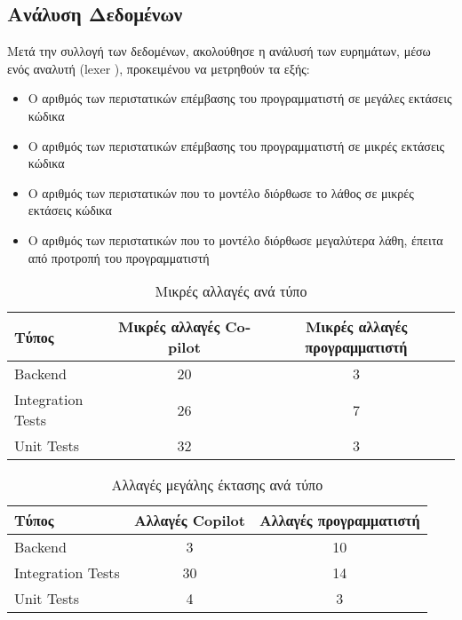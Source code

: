 \subsection{Ανάλυση Δεδομένων}

Μετά την συλλογή των δεδομένων, ακολούθησε η ανάλυσή των ευρημάτων, μέσω
ενός αναλυτή (\textlatin{lexer} \cite{ball2018}), προκειμένου να
μετρηθούν τα εξής:

\begin{itemize}
  \item
    O αριθμός των περιστατικών επέμβασης του προγραμματιστή σε μεγάλες
    εκτάσεις κώδικα
  \item
    Ο αριθμός των περιστατικών επέμβασης του προγραμματιστή σε μικρές
    εκτάσεις κώδικα
  \item
    Ο αριθμός των περιστατικών που το μοντέλο διόρθωσε το λάθος σε μικρές
    εκτάσεις κώδικα
  \item
    Ο αριθμός των περιστατικών που το μοντέλο διόρθωσε μεγαλύτερα λάθη,
    έπειτα από προτροπή του προγραμματιστή
\end{itemize}

\begin{table}[h]
  \centering
  \begin{tabular}{lcc}
    \hline
    \textbf{Τύπος} & \textbf{Μικρές αλλαγές \textlatin{Copilot}} &
    \textbf{Μικρές αλλαγές προγραμματιστή} \\ \hline
    \textlatin{Backend} & 20 & 3 \\
    \textlatin{Integration Tests} & 26 & 7 \\
    \textlatin{Unit Tests} & 32 & 3 \\ \hline
  \end{tabular}
  \caption{Μικρές αλλαγές ανά τύπο}
  \label{table:microchanges_by_subject}
\end{table}

\begin{table}[h]
  \centering
  \begin{tabular}{lcc}
    \hline
    \textbf{Τύπος} & \textbf{Αλλαγές \textlatin{Copilot}} &
    \textbf{Αλλαγές προγραμματιστή} \\ \hline
    \textlatin{Backend} & 3 & 10 \\
    \textlatin{Integration Tests} & 30 & 14 \\
    \textlatin{Unit Tests} & 4 & 3 \\ \hline
  \end{tabular}
  \caption{Αλλαγές μεγάλης έκτασης ανά τύπο}
  \label{table:major_changes_by_subject}
\end{table}

